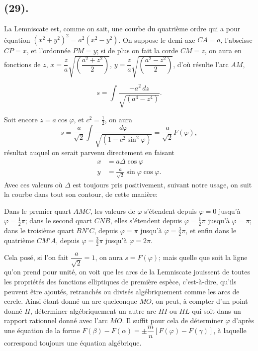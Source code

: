 \documentclass{article}
\begin{document}
\subsection*{(29).}


La Lemniscate est, comme on sait, une courbe du quatrième ordre qui a pour équation $(x^{2}+y^{2})^{2}=a^{2}(x^{2}-y^{2})$. On suppose le demi-axe $CA=a$, l'abscisse $CP=x$, et l'ordonnée $PM=y$; si de plus on fait la corde $CM=z$, on aura en fonctions de $z$, $x=\dfrac{z}{a}\sqrt{\left(\dfrac{a^{2}+z^{2}}{2}\right)}$, $y=\dfrac{z}{a}\sqrt{\left(\dfrac{a^{2}-z^{2}}{2}\right)}$, d'où résulte l'arc $AM$,

\[ s=\int\frac{-a^{2}\,dz}{\sqrt{(a^{4}-z^{4})}}. \]

Soit encore $z=a\cos\varphi$, et $c^{2}=\frac{1}{2}$, on aura
\[ s=\frac{a}{\sqrt{2}}\int\frac{d\varphi}{\sqrt{(1-c^{2}\sin^{2}\varphi)}}=\frac{a}{\sqrt{2}}F(\varphi), \]
résultat auquel on serait parvenu directement en faisant
\[ \begin{aligned} x &= a\Delta\cos\varphi \\ y &= \frac{a}{\sqrt{2}}\sin\varphi\cos\varphi. \end{aligned} \]
Avec ces valeurs où $\Delta$ est toujours pris positivement, suivant notre usage, on suit la courbe dans tout son contour, de cette manière:

Dans le premier quart $AMC$, les valeurs de $\varphi$ s'étendent depuis $\varphi=0$ jusqu'à $\varphi=\frac{1}{2}\pi$; dans le second quart $CNB$, elles s'étendent depuis $\varphi=\frac{1}{2}\pi$ jusqu'à $\varphi=\pi$; dans le troisième quart $BN'C$, depuis $\varphi=\pi$ jusqu'à $\varphi=\frac{3}{2}\pi$, et enfin dans le quatrième $CM'A$, depuis $\varphi=\frac{3}{2}\pi$ jusqu'à $\varphi=2\pi$.

Cela posé, si l'on fait $\dfrac{a}{\sqrt{2}}=1$, on aura $s=F(\varphi)$; mais quelle que soit la ligne qu'on prend pour unité, on voit que les arcs de la Lemniscate jouissent de toutes les propriétés des fonctions elliptiques de première espèce, c'est-à-dire, qu'ils peuvent être ajoutés, retranchés ou divisés algébriquement comme les arcs de cercle. Ainsi étant donné un arc quelconque $MO$, on peut, à compter d'un point donné $H$, déterminer algébriquement un autre arc $HI$ ou $HL$ qui soit dans un rapport rationnel donné avec l'arc $MO$. Il suffit pour cela de déterminer $\varphi$ d'après une équation de la forme $F(\beta)-F(\alpha)=\pm\dfrac{m}{n}[F(\varphi)-F(\gamma)]$, à laquelle correspond toujours une équation algébrique.
\end{document}
